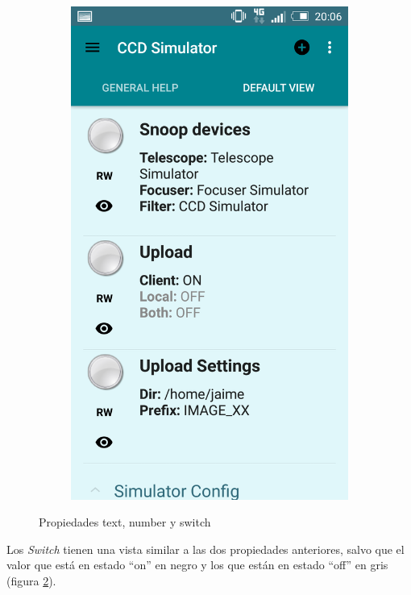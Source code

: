 \begin{figure}
\begin{subfigure}[]{0.4\textwidth}
        \includegraphics[width=\textwidth]{../images/captura13.png}
        \caption{}
        \label{fig:captura11}
    \end{subfigure}
    \caption{Propiedades text, number y switch}\label{fig:capturas6}
\end{figure}

Los \textit{Switch} tienen una vista similar a las dos propiedades anteriores, salvo que el valor que está en estado ``on'' en negro y los que están en estado ``off'' en gris (figura \ref{fig:capturas6}).


